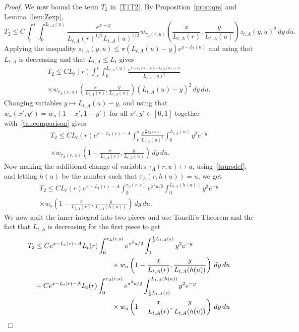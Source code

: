 \documentclass[10pt]{amsart}
\theoremstyle{definition}\newtheorem{defi}[theo]{Definition}\newtheorem{rema}[theo]{Remark}\newtheorem{exam}[theo]{Example}\newtheorem{exem}[theo]{Example}\newtheorem{nota}[theo]{Notation}
\newcommand{\1} {\mathds{1}}
\begin{document}
\begin{proof}
We now bound the term $T_2$ in~\eqref{T1T2}. By Proposition~\ref{prop:qrs} and Lemma~\ref{lem:Zexp},
\[
T_2 \leq C \int_r^s \int_0^{L_{t,A}(u)} \frac{e^{x-y}}{L_{t,A}(r)^{1/2}L_{t,A}(u)^{1/2}}w_{\tau_A(r,u)}\left(\frac{x}{L_{t,A}(r)}, \frac{y}{L_{t,A}(u)} \right)z_{t,A}(y,u)^2\,dy\,du.
\]
Applying the inequality $z_{t,A}(y,u) \le \pi(L_{t,A}(u)-y)e^{y-L_t(u)}$ and using that $L_{t,A}$ is decreasing and that $L_{t,A}\le L_t$ gives
\begin{multline*}
T_2 \leq CL_t(r)\int_r^s \int_0^{L_{t,A}(u)} \frac{e^{x-L_t(u)+y-L_{t,A}(u) - A}}{L_{t,A}(u)^2} \\
 \times w_{\tau_A(r,u)}\left(\frac{x}{L_{t,A}(r)}, \frac{y}{L_{t,A}(u)} \right)(L_{t,A}(u)-y)^2\,dy\,du.
\end{multline*}
Changing variables $y \mapsto L_{t,A}(u) - y$, and using that $w_u(x',y') = w_u(1-x',1-y')$ for all $x',y'\in[0,1]$ together with~\eqref{taucomparison} gives
\begin{multline}\label{T2prelim}
T_2 
\leq CL_t(r)e^{x-L_t(r)-A} \int_r^s \frac{e^{\frac{\pi^2}{2}\tau_A(r,u)}}{L_{t,A}(u)^2} \int_0^{L_{t,A}(u)} y^2e^{-y}\\
\times  w_{\tau_A(r,u)}\left(1-\frac{x}{L_{t,A}(r)}, \frac{y}{L_{t,A}(u)}\right)\,dy \,du.
\end{multline}
Now making the additional change of variables $\tau_A(r,u) \mapsto u$, using~\eqref{taursdef}, and letting $h(u)$ be the number such that $\tau_A(r, h(u)) = u$, we get
\begin{multline*}
T_2\leq CL_t(r) e^{x-L_t(r)-A} \int_0^{\tau_A(r,s)} e^{\pi^2 u/2} \int_0^{L_{t,A}(h(u))} y^2 e^{-y} \\
 \times w_u \left(1-\frac{x}{L_{t,A}(r)}, \frac{y}{L_{t,A}(h(u))}\right)\,dy \,du.
\end{multline*}
We now split the inner integral into two pieces and use Tonelli's Theorem and the fact that $L_{t,A}$ is decreasing for the first piece to get
\begin{equation}\label{T3T4}
\begin{split}
T_2
&\leq Ce^{x-L_t(r)-A} L_t(r) \int_0^{\tau_A(r,s)} e^{\pi^2 u/2} \int_0^{\frac{1}{2}L_{t,A}(s)} y^2 e^{-y}\\
&\mkern200mu \times w_u \left(1-\frac{x}{L_{t,A}(r)}, \frac{y}{L_{t,A}(h(u))}\right)\,dy \,du  \\
&+ Ce^{x-L_t(r)-A} L_t(r) \int_0^{\tau_A(r,s)} e^{\pi^2 u/2} \int_{\frac{1}{2} L_{t,A}(s)}^{L_{t,A}(h(u))} y^2 e^{-y} \\
& \mkern200mu \times w_u \left(1-\frac{x}{L_{t,A}(r)}, \frac{y}{L_{t,A}(h(u))}\right)\,dy \,du \\

\end{split}
\end{equation}
\end{proof}
\end{document}
